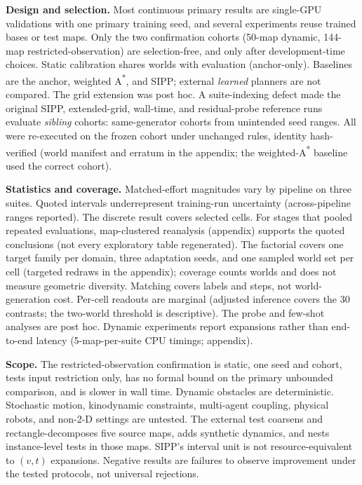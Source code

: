 \documentclass[letterpaper]{article} %
\begin{document}
\textbf{Design and selection.} Most continuous primary results are single-GPU validations with one primary training seed, and several experiments reuse trained bases or test maps. Only the two confirmation cohorts (50-map dynamic, 144-map restricted-observation) are selection-free, and only after development-time choices. Static calibration shares worlds with evaluation (anchor-only). Baselines are the anchor, weighted A\textsuperscript{*}, and SIPP; external \emph{learned} planners are not compared. The grid extension was post hoc. A suite-indexing defect made the original SIPP, extended-grid, wall-time, and residual-probe reference runs evaluate \emph{sibling} cohorts: same-generator cohorts from unintended seed ranges. All were re-executed on the frozen cohort under unchanged rules, identity hash-verified (world manifest and erratum in the appendix; the weighted-A\textsuperscript{*} baseline used the correct cohort).

\textbf{Statistics and coverage.} Matched-effort magnitudes vary by pipeline on three suites. Quoted intervals underrepresent training-run uncertainty (across-pipeline ranges reported). The discrete result covers selected cells. For stages that pooled repeated evaluations, map-clustered reanalysis (appendix) supports the quoted conclusions (not every exploratory table regenerated). The factorial covers one target family per domain, three adaptation seeds, and one sampled world set per cell (targeted redraws in the appendix); coverage counts worlds and does not measure geometric diversity. Matching covers labels and steps, not world-generation cost. Per-cell readouts are marginal (adjusted inference covers the 30 contrasts; the two-world threshold is descriptive). The probe and few-shot analyses are post hoc. Dynamic experiments report expansions rather than end-to-end latency (5-map-per-suite CPU timings; appendix).

\textbf{Scope.} The restricted-observation confirmation is static, one seed and cohort, tests input restriction only, has no formal bound on the primary unbounded comparison, and is slower in wall time. Dynamic obstacles are deterministic. Stochastic motion, kinodynamic constraints, multi-agent coupling, physical robots, and non-2-D settings are untested. The external test coarsens and rectangle-decomposes five source maps, adds synthetic dynamics, and nests instance-level tests in those maps. SIPP's interval unit is not resource-equivalent to $(v,t)$ expansions. Negative results are failures to observe improvement under the tested protocols, not universal rejections.
\end{document}
